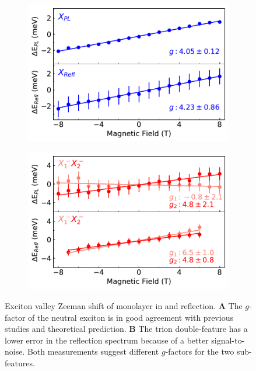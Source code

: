 \begin{figure}[t]
	\begin{subfigure}{0.49\textwidth}
		\caption{}
		\includegraphics[width=\textwidth]{G_X}
	\end{subfigure}
	\begin{subfigure}{0.49\textwidth}
		\caption{}
		\includegraphics[width=\textwidth]{G_T}
	\end{subfigure}
	\caption{Exciton valley Zeeman shift of monolayer \wse in \pl and reflection. \textbf{A} The $g$-factor of the neutral exciton is in good agreement with previous studies and theoretical prediction. \textbf{B} The trion double-feature has a lower error in the reflection spectrum because of a better signal-to-noise. Both measurements  suggest different $g$-factors for the two sub-features.}
	\label{Xfits}
\end{figure}

